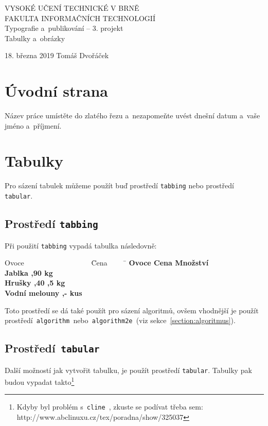 \documentclass[a4paper,11pt]{article}
\begin{document}
\begin{titlepage}

\begin{center}
{\Huge VYSOKÉ UČENÍ TECHNICKÉ V BRNĚ \\[0.3em]} {\huge FAKULTA INFORMAČNÍCH TECHNOLOGIÍ} \\
{\LARGE Typografie a~publikování – 3. projekt \\[0.3em]} {\Huge Tabulky a~obrázky}
\\
\end{center}

{\LARGE 18. března 2019 \hfill Tomáš Dvořáček}


\end{titlepage}


\section{Úvodní strana}
Název práce umístěte do zlatého řezu a~nezapomeňte uvést dnešní datum a~vaše jméno a~příjmení.
\section{Tabulky}
Pro sázení tabulek můžeme použít buď prostředí \texttt{tabbing} nebo prostředí \texttt{tabular}.

\subsection{Prostředí \texttt{tabbing}}
Při použití \texttt{tabbing} vypadá tabulka následovně:

\begin{tabbing}
    Ovoce ~~~~~~~~~~~~~~~~~~\= Cena ~~~~
    \=  \kill
    \bfseries Ovoce \>
    \bfseries Cena \>
    \bfseries Množství \\[2mm]
    Jablka ,90  kg \\
    Hrušky ,40 ,5 kg\\
    Vodní melouny ,-  kus
    \end{tabbing}
\smallskip

\noindent Toto prostředí se dá také použít pro sázení algoritmů, ovšem vhodnější je použít prostředí\texttt{ algorithm }nebo\texttt{ algorithm2e }(viz sekce~\ref{section:algoritmus}).

\subsection{Prostředí\texttt{ tabular}}
Další možností jak vytvořit tabulku, je použít prostředí \texttt{tabular}. Tabulky pak budou vypadat takto\footnote{Kdyby byl problém s\texttt{ cline }, zkuste se podívat třeba sem: http://www.abclinuxu.cz/tex/poradna/show/325037}
\end{document}
